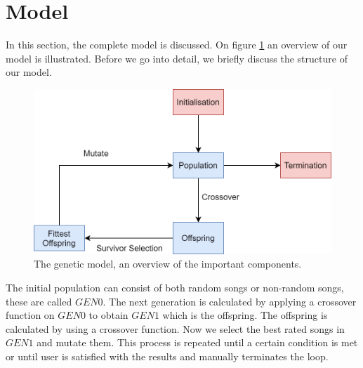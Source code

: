 \section{Model}
In this section, the complete model is discussed.  On figure \ref{fig:GA_MODEL} an overview of our model is illustrated. Before we go into detail, we briefly discuss the structure of our model.
\begin{figure}
    \includegraphics[width=\linewidth]{figures/GA_structure.png}
    \caption{The genetic model, an overview of the important components.}
    \label{fig:GA_MODEL}
\end{figure}
The initial population can consist of both random songs or non-random songs, these are called $GEN0$. The next generation is calculated by applying a crossover function on $GEN0$ to obtain $GEN1$ which is the offspring. The offspring is calculated by using a crossover function. Now we select the best rated songs in $GEN1$ and mutate them. This process is repeated until a certain condition is met or until user is satisfied with the results and manually terminates the loop.








